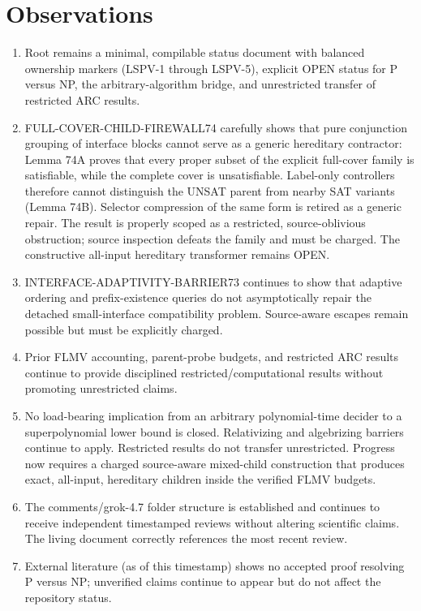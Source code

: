 \documentclass[11pt]{article}
\begin{document}
\section{Observations}
\begin{enumerate}
\item Root  remains a minimal, compilable status document with balanced ownership markers (LSPV-1 through LSPV-5), explicit OPEN status for P versus NP, the arbitrary-algorithm bridge, and unrestricted transfer of restricted ARC results.
\item FULL-COVER-CHILD-FIREWALL74 carefully shows that pure conjunction grouping of interface blocks cannot serve as a generic hereditary contractor: Lemma 74A proves that every proper subset of the explicit full-cover family is satisfiable, while the complete cover is unsatisfiable. Label-only controllers therefore cannot distinguish the UNSAT parent from nearby SAT variants (Lemma 74B). Selector compression of the same form is retired as a generic repair. The result is properly scoped as a restricted, source-oblivious obstruction; source inspection defeats the family and must be charged. The constructive all-input hereditary transformer remains OPEN.
\item INTERFACE-ADAPTIVITY-BARRIER73 continues to show that adaptive ordering and prefix-existence queries do not asymptotically repair the detached small-interface compatibility problem. Source-aware escapes remain possible but must be explicitly charged.
\item Prior FLMV accounting, parent-probe budgets, and restricted ARC results continue to provide disciplined restricted/computational results without promoting unrestricted claims.
\item No load-bearing implication from an arbitrary polynomial-time decider to a superpolynomial lower bound is closed. Relativizing and algebrizing barriers continue to apply. Restricted results do not transfer unrestricted. Progress now requires a charged source-aware mixed-child construction that produces exact, all-input, hereditary children inside the verified FLMV budgets.
\item The comments/grok-4.7 folder structure is established and continues to receive independent timestamped reviews without altering scientific claims. The living document correctly references the most recent review.
\item External literature (as of this timestamp) shows no accepted proof resolving P versus NP; unverified claims continue to appear but do not affect the repository status.
\end{enumerate}
\end{document}
